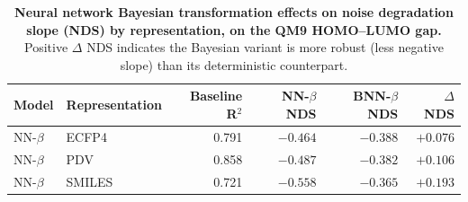 
\begin{table}[H]
\centering
\caption{\textbf{Neural network Bayesian transformation effects on noise degradation slope (NDS) by representation, on the QM9 HOMO--LUMO gap.}
Positive $\Delta$ NDS indicates the Bayesian variant is more robust (less negative slope) than its deterministic counterpart.}
\label{app:noise:bayesian_transformation_tests}
\small
\begin{tabular}{llrrrr}
\toprule
\textbf{Model} & \textbf{Representation} & \textbf{Baseline R$^2$} & \textbf{NN-$\beta$ NDS} & \textbf{BNN-$\beta$ NDS} & \textbf{$\Delta$ NDS} \\
\midrule
NN-$\beta$ & ECFP4 & 0.791 & $-0.464$ & $-0.388$ & $+0.076$ \\
NN-$\beta$ & PDV & 0.858 & $-0.487$ & $-0.382$ & $+0.106$ \\
NN-$\beta$ & SMILES & 0.721 & $-0.558$ & $-0.365$ & $+0.193$ \\
\bottomrule
\end{tabular}
\end{table}
